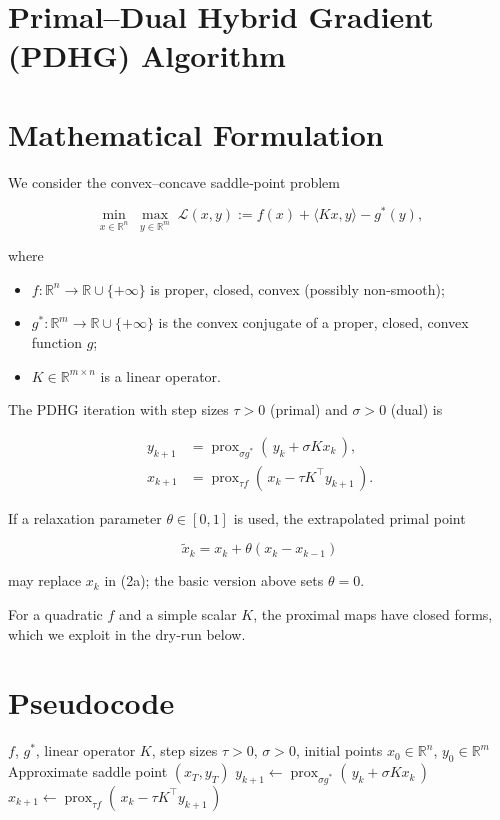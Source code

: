 \documentclass{article}
\newcommand{\prox}[2]{\operatorname{prox}_{#1}\!\left(#2\right)}
\begin{document}
\section*{Primal–Dual Hybrid Gradient (PDHG) Algorithm}

\section*{Mathematical Formulation}
We consider the convex–concave saddle‑point problem  

\[
\min_{x\in\mathbb R^{n}} \; \max_{y\in\mathbb R^{m}}
\; \mathcal L(x,y):= f(x) + \langle Kx , y\rangle - g^{*}(y),
\tag{1}
\]

where  

\begin{itemize}
  \item $f:\mathbb R^{n}\!\to\!\mathbb R\cup\{+\infty\}$ is proper, closed, convex (possibly non‑smooth);
  \item $g^{*}:\mathbb R^{m}\!\to\!\mathbb R\cup\{+\infty\}$ is the convex conjugate of a proper, closed, convex function $g$;
  \item $K\in\mathbb R^{m\times n}$ is a linear operator.
\end{itemize}

The PDHG iteration with step sizes $\tau>0$ (primal) and $\sigma>0$ (dual) is  

\[
\boxed{
\begin{aligned}
y_{k+1} &= \prox{\sigma g^{*}}{\,y_{k}+\sigma K x_{k}\,}, \tag{2a}\\[4pt]
x_{k+1} &= \prox{\tau f}{\,x_{k}-\tau K^{\!\top} y_{k+1}\,}. \tag{2b}
\end{aligned}}
\]

If a relaxation parameter $\theta\in[0,1]$ is used, the extrapolated primal point  

\[
\tilde x_{k}=x_{k}+\theta (x_{k}-x_{k-1})
\]

may replace $x_{k}$ in (2a); the basic version above sets $\theta=0$.

For a quadratic $f$ and a simple scalar $K$, the proximal maps have closed forms, which we exploit in the dry‑run below.

\section*{Pseudocode}
\begin{algorithm}[H]
\caption{Primal–Dual Hybrid Gradient (PDHG)}
\begin{algorithmic}[1]
\Require $f$, $g^{*}$, linear operator $K$, step sizes $\tau>0$, $\sigma>0$, initial points $x_{0}\in\mathbb R^{n}$, $y_{0}\in\mathbb R^{m}$
\Ensure Approximate saddle point $(x_{T},y_{T})$
    \State $y_{k+1}\gets \prox{\sigma g^{*}}{\,y_{k}+\sigma K x_{k}\,}$ 
    \State $x_{k+1}\gets \prox{\tau f}{\,x_{k}-\tau K^{\!\top} y_{k+1}\,}$ 
\EndFor
\end{algorithmic}
\end{algorithm}
\end{document}
